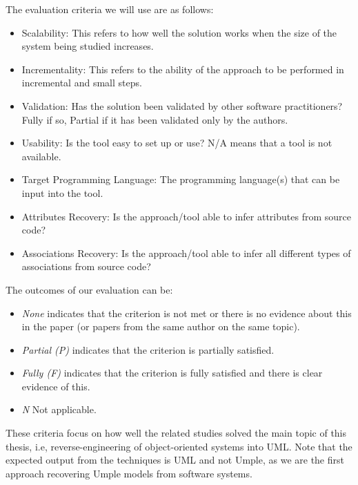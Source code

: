 The evaluation criteria we will use are as follows: 
\begin{itemize}

\item Scalability:  This refers to how well the solution works when the size of the system being studied increases.

\item Incrementality: This refers to the ability of the approach to be performed in incremental and small steps.

\item Validation:  Has the solution been validated by other software practitioners? Fully if so, Partial if it has been validated only by the authors. 

\item Usability: Is the tool easy to set up or use? N/A means that a tool is not available.

\item Target Programming Language: The programming language(s) that can be input into the tool.

\item Attributes Recovery: Is the approach/tool able to infer attributes from source code?

\item Associations Recovery: Is the approach/tool able to infer all different types of associations from source code? 
\end{itemize}

The outcomes of our evaluation can be:

\begin{itemize}
\item \textit{None} indicates that the criterion is not met or there is no evidence about this in the paper (or papers from the same author on the same topic).

\item \textit{Partial (P)} indicates that the criterion is partially satisfied.

\item \textit{Fully (F)} indicates that the criterion is fully satisfied and there is clear evidence of this.

\item \textit{N}  Not applicable. 
\end{itemize}

These criteria focus on how well the related studies solved the main topic of this thesis, i.e, reverse-engineering of object-oriented systems into UML. Note that the expected output from the techniques is UML and not Umple, as we are the first approach recovering Umple models from software systems.

